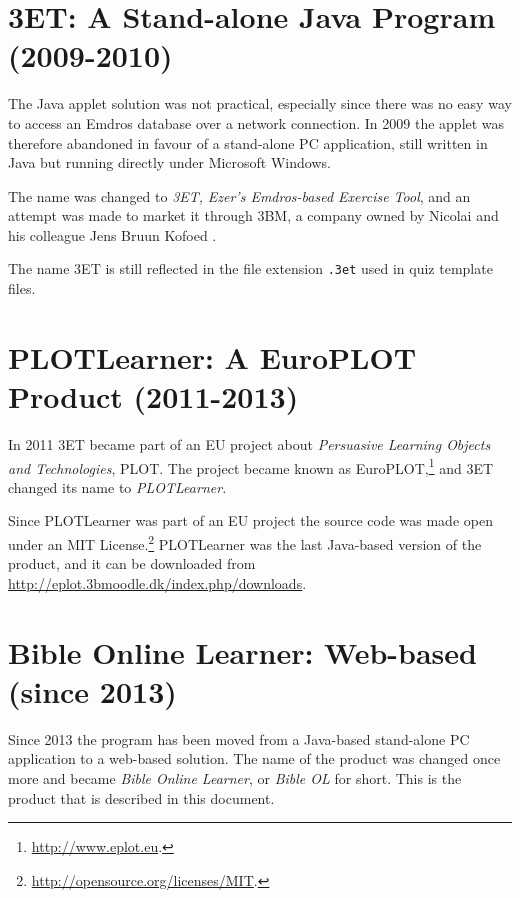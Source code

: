 \documentclass[11pt,oneside,a4paper]{memoir}
\begin{document}
\section{3ET: A Stand-alone Java Program (2009-2010)}

The Java applet solution was not practical, especially since there was no easy way to access an
Emdros database over a network connection. In 2009 the applet was therefore abandoned in favour of a
stand-alone PC application, still written in Java but running directly under Microsoft Windows.

The name was changed to \emph{3ET,} \emph{Ezer's Emdros-based Exercise Tool}, and an attempt was made to
market it through 3BM, a company owned by Nicolai and his colleague Jens Bruun Kofoed%
.

The name 3ET is still reflected in the file extension \texttt{.3et}
used in quiz template files.

\section{PLOTLearner: A EuroPLOT Product (2011-2013)}

In 2011 3ET became part of an EU project about \emph{Persuasive Learning Objects and Technologies},
PLOT. The project became known as EuroPLOT,\footnote{\url{http://www.eplot.eu}.} and
3ET changed its name to \emph{PLOTLearner.}

Since PLOTLearner was part of an EU project the source code was made open under an MIT
License.\footnote{\url{http://opensource.org/licenses/MIT}.} PLOTLearner was the last Java-based
version of the product, and it can be downloaded from
\url{http://eplot.3bmoodle.dk/index.php/downloads}.

\section{Bible Online Learner: Web-based (since 2013)}

Since 2013 the program has been moved from a Java-based stand-alone PC application to a web-based
solution. The name of the product was changed once more and became \emph{Bible Online Learner},
or \emph{Bible OL} for short. This is the product that is described in this document.
\end{document}
